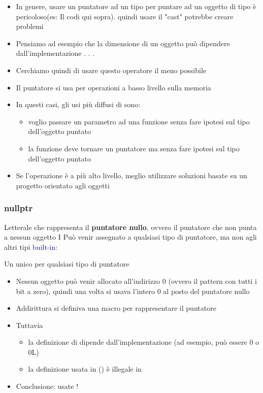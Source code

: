 \begin{itemize}
    \item In genere, usare un puntatore ad un tipo  per puntare ad  un oggetto di tipo  è pericoloso(es: Il codi qui sopra). quindi usare il "cast" potrebbe creare problemi
    \item Pensiamo ad esempio che la dimensione di un oggetto
    può dipendere dall’implementazione . . .
    \item Cerchiamo quindi di usare questo operatore il meno
    possibile
    \item Il puntatore  si usa per operazioni a basso livello sulla memoria
    \item In questi casi, gli usi più diffusi di  sono:
    \begin{itemize}
        \item voglio passare un parametro ad una funzione senza fare
        ipotesi sul tipo dell’oggetto puntato
        \item la funzione deve tornare un puntatore ma senza fare ipotesi sul tipo dell’oggetto puntato
    \end{itemize}
    
    \item Se l’operazione è a più alto livello, meglio utilizzare
    soluzioni basate su un progetto orientato agli oggetti

\end{itemize}

\subsubsection{nullptr}
Letterale che rappresenta il \textbf{puntatore nullo}, ovvero il
puntatore che non punta a nessun oggetto
I Può venir assegnato a qualsiasi tipo di puntatore, ma non
agli altri tipi \textcolor{blue}{built-in}:

 Un unico  per qualsiasi tipo di puntatore
 \begin{itemize}
    \item Nessun oggetto può venir allocato all’indirizzo 0 (ovvero il
    pattern con tutti i bit a zero), quindi una volta si usava
    l’intero 0 al posto del puntatore nullo
    \item Addirittura si definiva una macro  per rappresentare il
    puntatore 
    \item Tuttavia
    \begin{itemize}
        \item la definizione di  dipende dall’implementazione (ad esempio, può essere 0 o 0L)
        \item la definizione usata in  () è illegale in 
    \end{itemize}
    \item Conclusione: usate !

 \end{itemize}
\newpage

